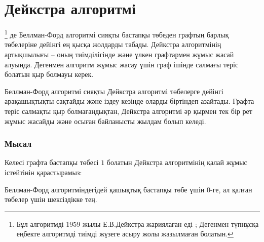 \section{Дейкстра алгоритмі}


\footnote{Бұл алгоритмді 1959 жылы Е.В.Дейкстра жариялаған еді \cite{dij59};
Дегенмен түпнұсқа еңбекте алгоритмді тиімді жүзеге асыру жолы жазылмаған болатын.}
де Беллман-Форд алгоритмі сияқты бастапқы төбеден графтың барлық
төбелеріне дейінгі ең қысқа жолдарды табады.
Дейкстра алгоритмінің артықшылығы -- оның тиімділігінде және
үлкен графтармен жұмыс жасай алуында.
Дегенмен алгоритм жұмыс жасау үшін граф ішінде 
салмағы теріс болатын қыр болмауы керек.

Беллман-Форд алгоритмі сияқты Дейкстра алгоритмі
төбелерге дейінгі арақашықтықты сақтайды және  
іздеу кезінде оларды біртіндеп азайтады.
Графта теріс салмақты қыр болмағандықтан, Дейкстра алгоритмі әр қырмен
тек бір рет жұмыс жасайды және осыған байланысты жылдам болып келеді.

\subsubsection{Мысал}

Келесі графта бастапқы төбесі $1$ болатын Дейкстра алгоритмінің қалай жұмыс 
істейтінін қарастырамыз:
\begin{center}
\end{center}
Беллман-Форд алгоритміндегідей қашықтық бастапқы төбе үшін  
$0$-ге, ал қалған төбелер үшін шексіздікке тең.

